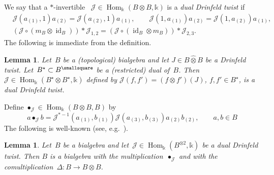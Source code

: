 \documentclass[12pt, reqno]{amsart}
\newcommand{\wh}[1]{\widehat{#1}}
\newtheorem{lemma}[theorem]{Lemma}
\theoremstyle{definition}
\numberwithin{equation}{section}
\newcommand{\tensor}{\otimes}
\newcommand{\kk}{\mathbb{k}}\newcommand{\lie}[1]{{\mathfrak{#1}}}
\DeclareMathOperator{\id}{id}
\DeclareMathOperator{\Hom}{Hom}
\begin{document}
We say that a $\ast$-invertible
~$\mathcal J\in\Hom_\kk(B\tensor B,\kk)$ is a {\em dual Drinfeld twist} if
\begin{align}
&\mathcal J(a_{(1)},1)a_{(2)}=\mathcal J(a_{(2)},1)a_{(1)},\qquad 
\mathcal J(1,a_{(1)})a_{(2)}=\mathcal J(1,a_{(2)})a_{(1)},\label{eq:dual Drinf eq 1}\\
&(\mathcal J\circ (m_B\tensor \id_B))\ast \mathcal J_{1,2}
=(\mathcal J\circ (\id_B\tensor m_B))\ast \mathcal J_{2,3}.\label{eq:dual Drinf eq 2}
\end{align}
The following is immediate from the definition.
\begin{lemma}
Let~$B$ be a (topological) bialgebra and let $J\in B\wh\tensor B$ be a Drinfeld twist. Let~$B^\star\subset B^\smallsquare$ be a (restricted) dual of~$B$.
Then
$\mathcal J\in\Hom_\kk(B^\star\tensor B^\star,\kk)$ defined by $\mathcal J(f,f')=(f\tensor f')(J)$,
$f,f'\in B^\star$,
is a dual Drinfeld twist. 
\end{lemma}
Define $\bullet_{\mathcal J}\in\Hom_\kk(B\tensor B,B)$ by
$$
a\bullet_{\mathcal J} b=\mathcal J^{\ast-1}(a_{(1)},b_{(1)})\mathcal J(a_{(3)},b_{(3)})
a_{(2)}b_{(2)},\qquad a,b\in B
$$
The following is well-known (see, e.g.~\cite{Majid}).
\begin{lemma}\label{lem:twisted product}
Let~$B$ be a bialgebra and let~$\mathcal J\in\Hom_\kk(B^{\tensor 2},\kk)$ be a dual Drinfeld twist. Then $B$ is a bialgebra with the multiplication~$\bullet_{\mathcal J}$
and with the comultiplication~$\Delta:B\to B\tensor B$.
\end{lemma}
\end{document}
